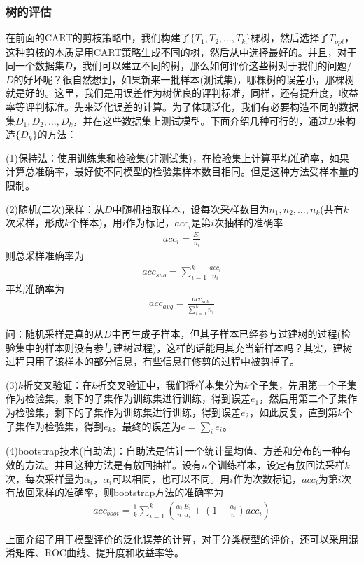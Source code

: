         \subsubsection{树的评估}
            \par
            在前面的CART的剪枝策略中，我们构建了$\{T_1,T_2,\dots,T_k\}$棵树，然后选择了$T_{opt}$，这种剪枝的本质是用CART策略生成不同的树，然后从中选择最好的。并且，对于同一个数据集$D$，我们可以建立不同的树，那么如何评价这些树对于我们的问题/$D$的好坏呢？很自然想到，如果新来一批样本(测试集)，哪棵树的误差小，那棵树就是好的。这里，我们是用误差作为树优良的评判标准，同样，还有提升度，收益率等评判标准。先来泛化误差的计算。为了体现泛化，我们有必要构造不同的数据集$D_1,D_2,\dots,D_k$，并在这些数据集上测试模型。下面介绍几种可行的，通过$D$来构造$\{D_k\}$的方法：
            \par
            (1)保持法：使用训练集和检验集(非测试集)，在检验集上计算平均准确率，如果计算总准确率，最好使不同模型的检验集样本数目相同。但是这种方法受样本量的限制。
            \par
            (2)随机(二次)采样：从$D$中随机抽取样本，设每次采样数目为$n_1,n_2,\dots,n_k$(共有$k$次采样，形成$k$个样本)，用$i$作为标记，$acc_i$是第$i$次抽样的准确率
            \begin{align*}
            acc_i = \frac{E_i}{n_i}
            \end{align*}
            则总采样准确率为
            \begin{align*}
            acc_{sub} = \sum_{i=1}^k\frac{acc_i}{n_i}
            \end{align*}
            平均准确率为
            \begin{align*}
            acc_{avg} = \frac{acc_{sub}}{\sum_{i=1}^kn_i}
            \end{align*}
            \par
            问：随机采样是真的从$D$中再生成子样本，但其子样本已经参与过建树的过程(检验集中的样本则没有参与建树过程)，这样的话能用其充当新样本吗？其实，建树过程只用了该样本的部分信息，有些信息在修剪的过程中被剪掉了。
            \par
            (3)$k$折交叉验证：在$k$折交叉验证中，我们将样本集分为$k$个子集，先用第一个子集作为检验集，剩下的子集作为训练集进行训练，得到误差$e_1$，然后用第二个子集作为检验集，剩下的子集作为训练集进行训练，得到误差$e_2$，如此反复，直到第$k$个子集作为检验集，得到$e_k$。最终的误差为$e = \sum_i e_i$。
            \par
            (4)bootstrap技术(自助法)：自助法是估计一个统计量均值、方差和分布的一种有效的方法。并且这种方法是有放回抽样。设有$n$个训练样本，设定有放回法采样$k$次，每次采样量为$\alpha_i$，$\alpha_i$可以相同，也可以不同。用$i$作为次数标记，$acc_i$为第$i$次有放回采样的准确率，则bootstrap方法的准确率为
            \begin{align*}
            acc_{boot} = \frac{1}{k}\sum_{i=1}^k \left( \frac{\alpha_i}{n} \frac{E_i}{\alpha_i}+(1-\frac{\alpha_i}{n})acc_i\right)
            \end{align*}
            \par
            上面介绍了用于模型评价的泛化误差的计算，对于分类模型的评价，还可以采用混淆矩阵、ROC曲线、提升度和收益率等。
